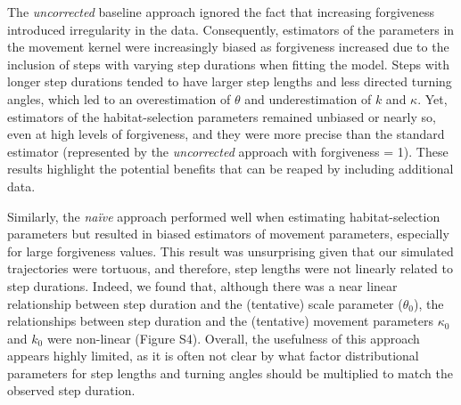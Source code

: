 \documentclass[abstract=on,10pt,a4paper,bibliography=totocnumbered]{article}
\begin{document}
The \textit{uncorrected} baseline approach ignored the fact that increasing
forgiveness introduced irregularity in the data. Consequently, estimators of the
parameters in the movement kernel were increasingly biased as forgiveness
increased due to the inclusion of steps with varying step durations when fitting
the model. Steps with longer step durations tended to have larger step lengths
and less directed turning angles, which led to an overestimation of $\theta$ and
underestimation of $k$ and $\kappa$. Yet, estimators of the habitat-selection
parameters remained unbiased or nearly so, even at high levels of forgiveness,
and they were more precise than the standard estimator (represented by the
\textit{uncorrected} approach with forgiveness = 1). These results highlight the
potential benefits that can be reaped by including additional data.

Similarly, the \textit{na\"ive} approach performed well when estimating
habitat-selection parameters but resulted in biased estimators of movement
parameters, especially for large forgiveness values. This result was
unsurprising given that our simulated trajectories were tortuous, and therefore,
step lengths were not linearly related to step durations. Indeed, we found that,
although there was a near linear relationship between step duration and the
(tentative) scale parameter ($\theta_0$), the relationships between step
duration and the (tentative) movement parameters $\kappa_0$ and $k_0$ were
non-linear (Figure S4). Overall, the usefulness of this approach appears highly
limited, as it is often not clear by what factor distributional parameters for
step lengths and turning angles should be multiplied to match the observed step
duration.
\end{document}
